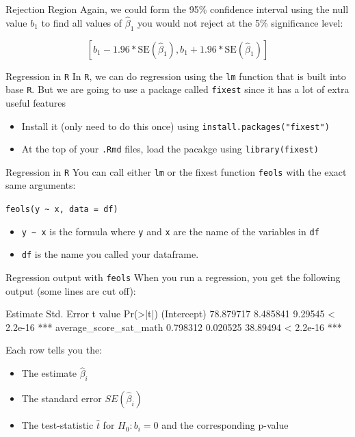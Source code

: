 \documentclass[aspectratio=169,t,11pt,table]{beamer}
\begin{document}
\begin{frame}{Rejection Region}
  Again, we could form the 95\% confidence interval using the null value $b_1$ to find all values of $\hat{\beta}_1$ you would not reject at the 5\% significance level:

  $$
    \left[
      b_1 - 1.96 * \text{SE}(\hat{\beta}_1),
      b_1 + 1.96 * \text{SE}(\hat{\beta}_1)
    \right]
  $$
\end{frame}

\begin{frame}{Regression in \texttt{R}}
  In \texttt{R}, we can do regression using the \texttt{lm} function that is built into base \texttt{R}. But we are going to use a package called \texttt{fixest} since it has a lot of extra useful features
  \begin{itemize}
    \item Install it (only need to do this once) using \texttt{install.packages("fixest")}
    
    \item At the top of your \texttt{.Rmd} files, load the pacakge using \texttt{library(fixest)}
  \end{itemize}
\end{frame}

\begin{frame}{Regression in \texttt{R}}
  You can call either \texttt{lm} or the fixest function \texttt{feols} with the exact same arguments:
  
  \texttt{feols(y \textasciitilde{} x, data = df)}
  \begin{itemize}
    \item \texttt{y \textasciitilde{} x} is the formula where \texttt{y} and \texttt{x} are the name of the variables in \texttt{df}
    \item \texttt{df} is the name you called your dataframe.
  \end{itemize}
\end{frame}

\begin{frame}[fragile]{Regression output with \texttt{feols}}
  When you run a regression, you get the following output (some lines are cut off): 

  \begin{codeblock}[{}]
                        Estimate Std. Error  t value  Pr(>|t|)
(Intercept)            78.879717   8.485841  9.29545 < 2.2e-16 ***
average_score_sat_math  0.798312   0.020525 38.89494 < 2.2e-16 ***
  \end{codeblock}

  \pause
  Each row tells you the:
  \begin{itemize}
    \item The estimate $\hat{\beta}_i$
    \item The standard error $SE(\hat{\beta}_i)$
    \item The test-statistic $\hat{t}$ for $H_0: b_i = 0$ and the corresponding p-value
  \end{itemize} 
\end{frame}
\end{document}
